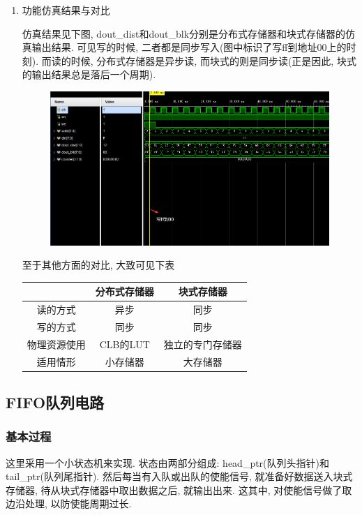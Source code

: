 \documentclass[UTF8]{article}
\begin{document}
\begin{enumerate}
	\item 功能仿真结果与对比\par
	仿真结果见下图, dout\_dist和dout\_blk分别是分布式存储器和块式存储器的仿真输出结果.
	可见写的时候, 二者都是同步写入(图中标识了写ff到地址00上的时刻).
	而读的时候, 分布式存储器是异步读, 而块式的则是同步读(正是因此, 块式的输出结果总是落后一个周期).
	\begin{figure}[H]
		\centering
		\includegraphics[scale=0.4]{difference_blk_dist.png}
	\end{figure}\par
	至于其他方面的对比, 大致可见下表
	\begin{center}
		\begin{tabular}{|c|c|c|}
		\hline
		 & 分布式存储器 & 块式存储器 \\
		\hline
		读的方式 & 异步 & 同步 \\
		\hline
		写的方式 & 同步 & 同步 \\
		\hline
		物理资源使用 & CLB的LUT & 独立的专门存储器 \\
		\hline
		适用情形 & 小存储器 & 大存储器 \\
		\hline
		\end{tabular}
	\end{center}
\end{enumerate}
\subsection{FIFO队列电路}
\subsubsection{基本过程}
这里采用一个小状态机来实现. 状态由两部分组成: head\_ptr(队列头指针)和tail\_ptr(队列尾指针). 然后每当有入队或出队的使能信号, 就准备好数据送入块式存储器, 待从块式存储器中取出数据之后, 就输出出来. 这其中, 对使能信号做了取边沿处理, 以防使能周期过长.
\end{document}
